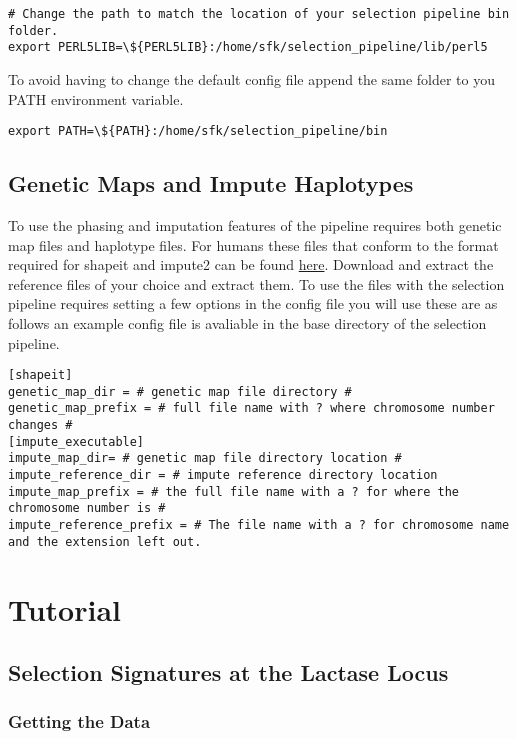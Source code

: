 \documentclass[a4paper,10pt]{article}
\begin{document}
\begin{verbatim}
# Change the path to match the location of your selection pipeline bin folder.
export PERL5LIB=\${PERL5LIB}:/home/sfk/selection_pipeline/lib/perl5
\end{verbatim}

To avoid having to change the default config file append the same folder to you PATH environment variable.\\
\begin{verbatim}
export PATH=\${PATH}:/home/sfk/selection_pipeline/bin
\end{verbatim}

\subsection{Genetic Maps and Impute Haplotypes}
To use the phasing and imputation features of the pipeline requires both genetic map files and haplotype files. For humans these files that conform to the format required for shapeit and impute2 can be found \href{http://mathgen.stats.ox.ac.uk/impute/impute_v2.html#reference}{here}. Download and extract the reference files of your choice and extract them. To use the files with the selection pipeline requires setting a few options in the config file you will use these are as follows an example config file is avaliable in the base directory of the selection pipeline.\\
\begin{verbatim}
[shapeit]
genetic_map_dir = # genetic map file directory #
genetic_map_prefix = # full file name with ? where chromosome number changes #
[impute_executable]
impute_map_dir= # genetic map file directory location #
impute_reference_dir = # impute reference directory location
impute_map_prefix = # the full file name with a ? for where the chromosome number is #
impute_reference_prefix = # The file name with a ? for chromosome name and the extension left out. 
\end{verbatim}

\section{Tutorial}
\subsection{Selection Signatures at the Lactase Locus}
\subsubsection{Getting the Data}
\end{document}
